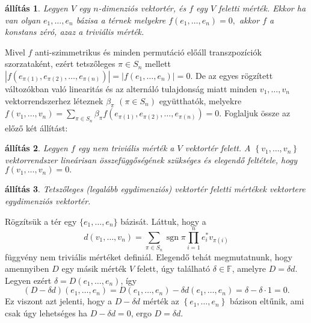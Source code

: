 \documentclass[9pt, a4paper, showtrims]{memoir}
\makeatletter
\renewenvironment{proof}[1][\proofname]
    {\par\pushQED{\qed}%
    \normalfont \topsep6\p@\@plus6\p@\relax
    \trivlist
    \item[\hskip\labelsep
        \itshape
    #1\@addpunct{:}]\ignorespaces}
    {\popQED\endtrivlist\@endpefalse}
\theoremstyle{plain}
\newtheorem{proposition}{állítás}[chapter]
\theoremstyle{remark}
\theoremstyle{definition}
\DeclareMathOperator{\sgn}{sgn}
\makeatother
\begin{document}
\begin{proposition}
	Legyen $V$ egy $n$-dimenziós vektortér, és $f$ egy $V$ feletti mérték.
	Ekkor ha van olyan $e_{1},\ldots ,e_{n}$ bázisa a térnek melyekre
	\(
	f\left( e_{1},\ldots ,e_{n}\right)
	=
	0,
	\)
	akkor $f$ a konstans zéró, azaz a triviális mérték.
\end{proposition}
\begin{proof}
	Mivel $f$ anti-szimmetrikus és minden permutáció előáll transzpozíciók szorzataként,
	ezért tetszőleges $\pi \in S_{n}$ mellett
	$\left| f\left(e_{\pi \left( 1\right) },e_{\pi \left( 2\right) },\ldots ,e_{\pi \left(n\right) }\right) \right|
		=
		\left| f\left( e_{1},\ldots ,e_{n}\right) \right|
		=
		0.
	$
	De az egyes rögzített változókban való linearitás és az alternáló tulajdonság miatt minden
	$v_{1},\ldots ,v_{n}$ vektorrendszerhez léteznek
	$\beta _{\pi }$ $\left( \pi \in S_{n}\right) $ együtthatók,
	melyekre
	$f\left(v_{1},\ldots ,v_{n}\right)
		=
		\sum_{\pi \in S_{n}}\beta _{\pi }f\left( e_{\pi\left( 1\right) },e_{\pi \left( 2\right) },\ldots ,e_{\pi \left( n\right)}\right)
		=
		0.$
\end{proof}
Foglaljuk össze az előző két állítást:
\begin{proposition}
	Legyen $f$ egy nem triviális mérték a $V$ vektortér felett. A
	\begin{math}
		\left\{ v_1,\ldots,v_n \right\}
	\end{math}
	vektorrendszer lineárisan összefüggőségének szükséges és elegendő feltétele,
	hogy
	\begin{math}
		f\left( v_1,\ldots,v_n \right)
		=
		0.
	\end{math}
\end{proposition}

\begin{proposition}
	Tetszőleges (legalább egydimenziós) vektortér feletti mértékek vektortere egydimenziós vektortér.
\end{proposition}
\begin{proof}
	Rögzítsük a tér egy $\{e_{1},\ldots ,e_{n}\}$ bázisát.
	Láttuk, hogy a
	\[
		d\left(v_{1},\ldots ,v_{n}\right)
		=
		\sum_{\pi \in S_{n}}\sgn\pi\prod_{i=1}^ne_i^\ast v_{\pi\left( i\right)}
	\]
	függvény nem triviális mértéket definiál.
	Elegendő tehát megmutatnunk,
	hogy amennyiben $D$ egy másik mérték $V$ felett,
	úgy található
	$\delta\in \mathbb{F}$,
	amelyre
	$D=\delta d.$
	Legyen ezért
	$\delta
		=
		D\left( e_{1},\ldots,e_{n}\right)
	$,
	így
	\[
		\left( D-\delta d \right)\left( e_1,\ldots,e_n \right)
		=
		D\left( e_{1},\ldots ,e_{n}\right) -\delta d\left(e_{1},\ldots ,e_{n}\right)
		=
		\delta-\delta\cdot 1
		=
		0.
	\]
	Ez viszont azt jelenti,
	hogy a $D-\delta d$ mérték az  $\left\{e_{1},\ldots ,e_{n}  \right\}$
	bázison eltűnik,
	ami csak úgy lehetséges ha
	$D-\delta d=0$,
	ergo
	\begin{math}
		D=\delta d.
	\end{math}
\end{proof}
\end{document}
